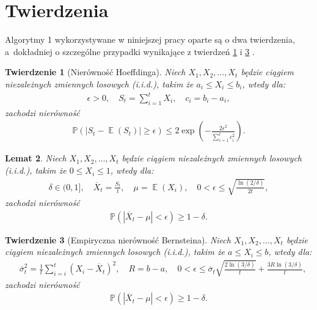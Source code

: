 \documentclass[inzynierska]{pwr_wmat_praca_dyplomowa}
\theoremstyle{plain}
\newtheorem{theorem}{Twierdzenie}
\numberwithin{theorem}{chapter}
\newtheorem{lemma}[theorem]{Lemat}
\theoremstyle{definition}
\numberwithin{theorem}{chapter}
\DeclareMathOperator{\EX}{\mathbb{E}}%
\newcommand{\probP}{\mathbb{P}}
\newcommand{\newbrackets}[1]{\emph{(}{#1}\emph{)}}
\begin{document}
	\section{Twierdzenia}
	Algorytmy 1  wykorzystywane w niniejszej pracy oparte są o dwa twierdzenia, a~dokładniej o szczególne przypadki wynikające z twierdzeń \ref{Hoeffding ineq} i \ref{Bernsteina emp ineq} \cite{heidrich2011non}.
	\begin{theorem}[Nierówność Hoeffdinga]
		\label{Hoeffding ineq}
		Niech $X_1, X_2, \dots, X_t$ będzie ciągiem niezależnych zmiennych losowych \newbrackets{i.i.d.}, takim że $a_i \le X_i \le b_i$, wtedy dla:
		\begin{gather*}
			\epsilon > 0,\quad
			S_t = \sum_{i=1}^{t} X_i, \quad c_i = b_i - a_i,
		\end{gather*}
		zachodzi nierówność
		\begin{gather*}
			\label{eq:Hoeffding ineq}
			\probP(|S_t - \EX(S_t)| \ge \epsilon ) \le 2 \exp\left(-\frac{2\epsilon^2}{\sum_{i=1}^{t} c_i^2} \right).
		\end{gather*}
	\end{theorem}
	\begin{lemma}
		\label{Hoeffding ineq lemma}
		Niech $X_1, X_2, \dots, X_t$ będzie ciągiem niezależnych zmiennych losowych \newbrackets{i.i.d.}, takim że $0 \le X_i \le 1$, wtedy dla: 
		\begin{gather*}
			\delta\in (0, 1], \quad
			\overline{X}_t = \frac{S_t}{t},\quad 
			\mu = \EX(X_i), \quad  	
			0 < \epsilon \le  \sqrt{\frac{\ln(2/\delta)}{2t}},
		\end{gather*}
	zachodzi nierówność
		\begin{gather*}
			\probP(|\overline{X}_t - \mu | < \epsilon ) \ge 1 - \delta.
		\end{gather*}
	\end{lemma}
	\begin{theorem}[Empiryczna nierówność Bernsteina]
		\label{Bernsteina emp ineq}
		Niech $X_1, X_2, \dots, X_t$ będzie ciągiem niezależnych zmiennych losowych \newbrackets{i.i.d.}, takim że $a \le X_i \le b$, wtedy dla:
		\begin{gather*}
			\quad \overline \sigma_t^2 = \frac{1}{t}\sum_{i=i}^{t}(X_i - \overline{X}_t)^2,\quad R = b-a ,\quad
			\label{eq:Bernstein ineq}
			0 < \epsilon \le \overline{\sigma}_t \sqrt{\frac{2\ln(3/\delta)}{t}} + \frac{3 R \ln{(3 / \delta)}}{t},
		\end{gather*}
		zachodzi nierówność
		\begin{gather*}
			\probP(|\overline{X}_t - \mu | < \epsilon ) \ge 1 - \delta.
		\end{gather*}
	\end{theorem}
\end{document}
